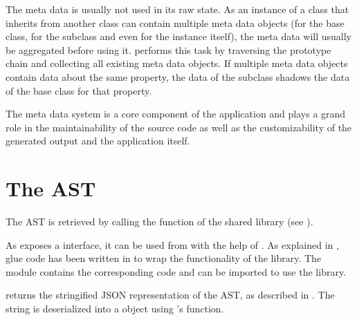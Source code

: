 The meta data is usually not used in its raw state. As an instance of a class that inherits from another class can contain multiple meta data objects (for the base class, for the subclass and even for the instance itself), the meta data will usually be aggregated before using it.  performs this task by traversing the prototype chain and collecting all existing meta data objects. If multiple meta data objects contain data about the same property, the data of the subclass shadows the data of the base class for that property.

The meta data system is a core component of the application and plays a grand role in the maintainability of the source code as well as the customizability of the generated output and the application itself.

\section{The  AST}
\label{sec:CPPAST}

The  AST is retrieved by calling the  function of the  shared library (see ).

As  exposes a  interface, it can be used from  with the help of . As explained in , glue code has been written in  to wrap the functionality of the library. The  module contains the corresponding code and can be imported to use the  library.

 returns the stringified JSON representation of the  AST, as described in . The string is deserialized into a  object using 's  function.

